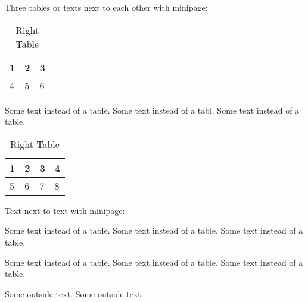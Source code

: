 			\noindent
			Three tables or texts next to each other with minipage:
			\begin{table}[htbp]
				\centering
				\begin{minipage}[t]{0.3\textwidth}
					\centering
					\begin{tabular}{|l|l|l|}
						\hline
						1 & 2 & 3 \\
						\hline
						4 & 5 & 6 \\
						\hline
					\end{tabular}
					\caption{Left Table}
				\end{minipage}
				\hfill
				\begin{minipage}[t]{0.3\textwidth}
						Some text instead of a table. Some text instead of a tabl. Some text instead of a table.
				\end{minipage}
				\hfill
				\begin{minipage}[t]{0.3\textwidth}
					\centering
					\begin{tabular}{|l|l|l|l|}
						\hline
						1 & 2 & 3 & 4 \\
						\hline
						5 & 6 & 7 & 8 \\
						\hline
					\end{tabular}
					\caption{Right Table}
				\end{minipage}
			\end{table}
			
			\clearpage
			\noindent
			Text next to text with minipage: \bigbreak \noindent
			\begin{minipage}{0.5\textwidth}
				Some text instead of a table. Some text instead of a table. Some text instead of a table.
			\end{minipage}
			\hfill
			\begin{minipage}{0.5\textwidth}
				Some text instead of a table. Some text instead of a table. Some text instead of a table.
			\end{minipage}
			\bigbreak \noindent
			Some outside text. Some outside text.
			

